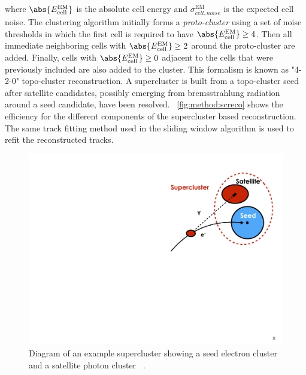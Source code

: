 where $\abs{E^{\mathrm{EM}}_{\mathrm{cell}}}$ is the absolute cell energy and $\sigma^{\mathrm{EM}}_{cell,noise}$ is the expected cell noise. The clustering algorithm initially forms a \emph{proto-cluster} using a set of noise thresholds in which the first cell is required to have $\abs{E^{\mathrm{EM}}_{\mathrm{cell}}} \geq 4$. Then all immediate neighboring cells with $\abs{E^{\mathrm{EM}}_{\mathrm{cell}}} \geq 2$ around the proto-cluster are added. Finally, cells with $\abs{E^{\mathrm{EM}}_{\mathrm{cell}}} \geq 0$ adjacent to the cells that were previously included are also added to the cluster. This formalism is known as "4-2-0" topo-cluster reconstruction. A supercluster is built from a topo-cluster seed after satellite candidates, possibly emerging from bremsstrahlung radiation around a seed candidate, have been resolved. ~\cref{fig:method:screco} shows the efficiency for the different components of the supercluster based reconstruction. The same track fitting method used in the sliding window algorithm is used to refit the reconstructed tracks.
\begin{figure}[h]
    \centering
    \includegraphics[width=\mediumfigwidth]{images/topo-cluster.pdf}
    \caption[Diagram of an example supercluster showing a seed electron cluster and a satellite photon cluster.]{Diagram of an example supercluster showing a seed electron cluster and a satellite photon cluster ~\cite{ATL-PHYS-PUB-2017-022}.}
    \label{fig:method:superclusterscheme}
\end{figure}
